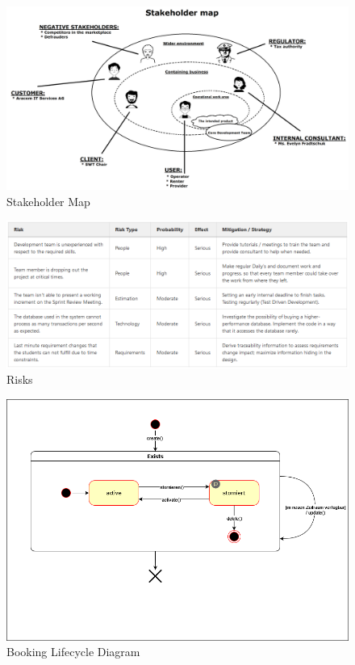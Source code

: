 \begin{figure}[h]
	\centering
	\includegraphics[width=12cm]{resources/images/stakeholder_map.png}
	\caption{Stakeholder Map}
	\label{fig:stakeholder_map}
\end{figure}

\begin{figure}[h]
	\centering
	\includegraphics[width=15cm]{resources/images/risks.png}
	\caption{Risks}
	\label{fig:risks}
\end{figure}

\begin{figure}[h]
	\centering
	\includegraphics[width=15cm]{resources/images/booking_lifecycle_diagram.png}
	\caption{Booking Lifecycle Diagram}
	\label{fig:booking_lifecycle_diagram}
\end{figure}

